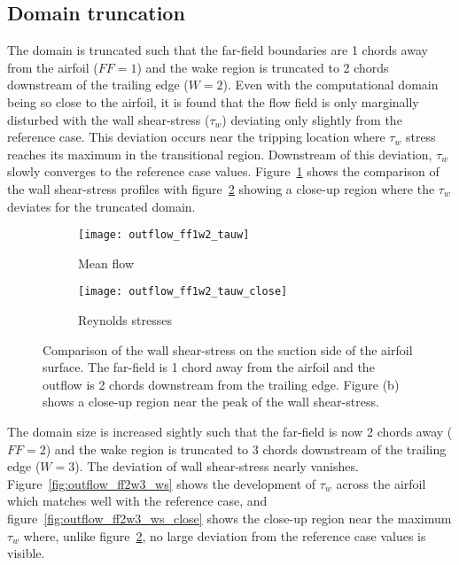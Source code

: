 \subsection{Domain truncation}
The domain is truncated such that the far-field boundaries are 1 chords away from the airfoil ($FF=1$) and the wake region is truncated to 2 chords downstream of the trailing edge ($W=2$). Even with the computational domain being so close to the airfoil, it is found that the flow field is only marginally disturbed with the wall shear-stress ($\tau_{w}$) deviating only slightly from the reference case. This deviation occurs near the tripping location where $\tau_{w}$ stress reaches its maximum in the transitional region. Downstream of this deviation, $\tau_{w}$ slowly converges to the reference case values. Figure~\ref{fig:outflow_ff1w2_ws} shows the comparison of the wall shear-stress profiles with figure~\ref{fig:outflow_ff1w2_ws_close} showing a close-up region where the $\tau_{w}$ deviates for the truncated domain.
\begin{figure}
	\centering
	\begin{subfigure}[h]{0.45\textwidth}
		\centering
		\texttt{[image: outflow\_ff1w2\_tauw]}
		\caption{Mean flow}
		\label{fig:outflow_ff1w2_ws}
	\end{subfigure}
	\begin{subfigure}[h]{0.45\textwidth}
		\centering
		\texttt{[image: outflow\_ff1w2\_tauw\_close]}
		\caption{Reynolds stresses}
		\label{fig:outflow_ff1w2_ws_close}
	\end{subfigure}
	\caption{Comparison of the wall shear-stress on the suction side of the airfoil surface. The far-field is 1 chord away from the airfoil and the outflow is 2 chords downstream from the trailing edge. Figure (b) shows a close-up region near the peak of the wall shear-stress.}
	\label{fig:outflow_ff1w2}
\end{figure}
The domain size is increased sightly such that the far-field is now 2 chords away ($FF=2$) and the wake region is truncated to 3 chords downstream of the trailing edge ($W=3$). The deviation of wall shear-stress nearly vanishes. Figure~\ref{fig:outflow_ff2w3_ws} shows the development of $\tau_{w}$ across the airfoil which matches well with the reference case, and figure~\ref{fig:outflow_ff2w3_ws_close} shows the close-up region near the maximum $\tau_{w}$ where, unlike figure~\ref{fig:outflow_ff1w2_ws_close}, no large deviation from the reference case values is visible.
